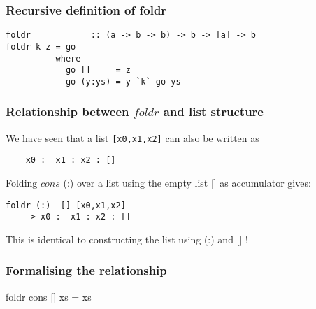 \documentclass{beamer}
\begin{document}
\begin{frame}[fragile]
\frametitle{Recursive definition of foldr}

\begin{verbatim}
foldr            :: (a -> b -> b) -> b -> [a] -> b
foldr k z = go
          where
            go []     = z
            go (y:ys) = y `k` go ys
\end{verbatim}

\end{frame}

\begin{frame}[fragile]
\frametitle{Relationship between $foldr$ and list structure}
We have seen that a list \texttt{[x0,x1,x2]} can also be written as

\begin{verbatim}
	x0 :  x1 : x2 : []
\end{verbatim}

Folding $cons$ (:) over a list using the empty list [] as accumulator gives:

\begin{verbatim}
foldr (:)  [] [x0,x1,x2]
  -- > x0 :  x1 : x2 : []
\end{verbatim}

This is identical to constructing the list using (:) and [] !

\end{frame}


\begin{frame}[fragile]
\frametitle{Formalising the relationship}

\begin{theorem}
foldr cons [] xs = xs
\end{theorem}

\end{frame}
\end{document}
